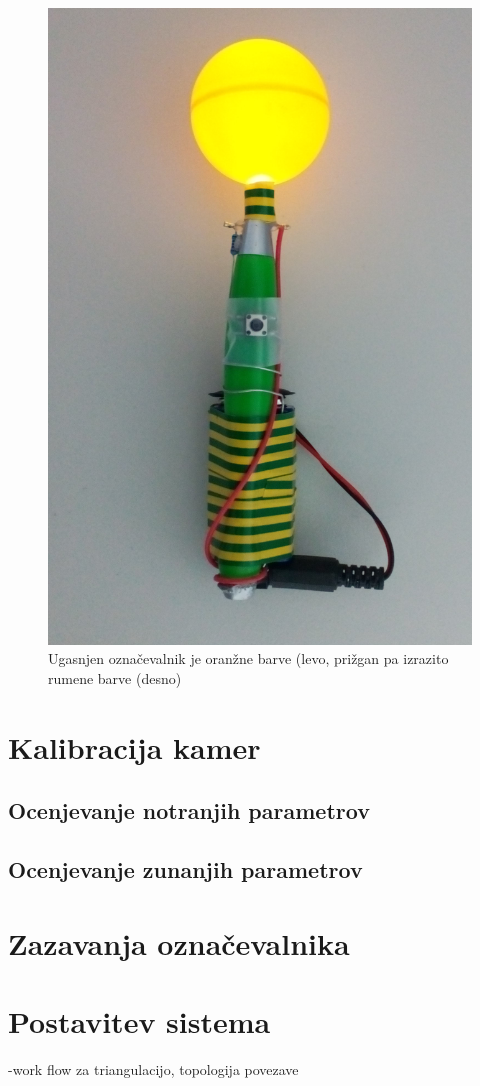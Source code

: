\documentclass[a4paper, 12pt]{book}
\begin{document}
\begin{figure}[H]
\includegraphics[scale=0.4]{marker_on.png}
\caption{Ugasnjen označevalnik je oranžne barve (levo, prižgan pa izrazito rumene barve (desno)}
\end{figure}

\section{Kalibracija kamer}
\subsection{Ocenjevanje notranjih parametrov}

\subsection{Ocenjevanje zunanjih parametrov}

\section{Zazavanja označevalnika}

\section{Postavitev sistema}
-work flow za triangulacijo, topologija povezave


{}

\end{document}
